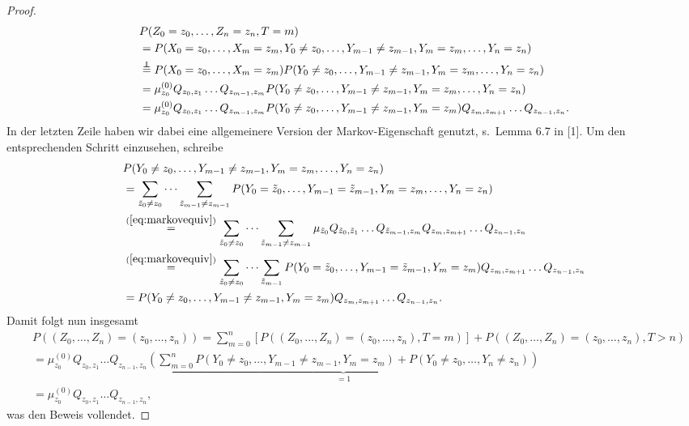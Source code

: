 \documentclass[twoside]{article}
\newcommand\independent{\protect\mathpalette{\protect\independenT}{\perp}}
\def\independenT#1#2{\mathrel{\rlap{$#1#2$}\mkern2mu{#1#2}}}
\theoremstyle{definition}
\begin{document}
\begin{proof}
\begin{align}
&P(Z_0= z_0,\dots,Z_n=z_n, T = m)\\
&=P(X_0 = z_0, \dots , X_m = z_m , Y_0 \neq z_0 , \dots , Y_{m-1} \neq z_{m-1} , Y_m = z_m , \dots , Y_n = z_n)\\
&\overset{\independent}{=}P(X_0 = z_0, \dots , X_m = z_m) P(Y_0 \neq z_0 , \dots , Y_{m-1} \neq z_{m-1} , Y_m = z_m , \dots , Y_n = z_n)\\
&= \mu_{z_0}^{(0)} Q_{z_0,z_1} \dots Q_{z_{m-1},z_m} P(Y_0 \neq z_0 , \dots , Y_{m-1} \neq z_{m-1} , Y_m = z_m , \dots , Y_n = z_n)\\
&=\mu_{z_0}^{(0)} Q_{z_0,z_1} \dots Q_{z_{m-1},z_m} P(Y_0 \neq z_0 , \dots , Y_{m-1} \neq z_{m-1} , Y_m = z_m) Q_{z_m,z_{m+1}} \dots Q_{z_{n-1},z_n}.
\end{align}
In der letzten Zeile haben wir dabei eine allgemeinere Version der Markov-Eigenschaft genutzt, s.\ Lemma 6.7 in [1]. Um den entsprechenden Schritt einzusehen, schreibe
\begin{align}
&P(Y_0 \neq z_0 , \dots , Y_{m-1} \neq z_{m-1} , Y_m = z_m , \dots , Y_n = z_n) \\
&=\sum_{\tilde{z}_0 \neq z_0} \dots \sum_{\tilde{z}_{m-1} \neq z_{m-1}} P(Y_0 = \tilde{z}_0 , \dots , Y_{m-1} = \tilde{z}_{m-1} , Y_m = z_m , \dots , Y_n = z_n)\\
&\overset{(\ref{eq:markovequiv})}{=}\sum_{\tilde{z}_0 \neq z_0} \dots \sum_{\tilde{z}_{m-1} \neq z_{m-1}} \mu_{\tilde{z}_0} Q_{\tilde{z}_0,\tilde{z}_1} \dots Q_{\tilde{z}_{m-1},z_m} Q_{z_m, z_{m+1}} \dots Q_{z_{n-1}, z_n}\\
&\overset{(\ref{eq:markovequiv})}{=}\sum_{\tilde{z}_0 \neq z_0} \dots \sum_{\tilde{z}_{m-1}} P(Y_0 = \tilde{z}_0 , \dots , Y_{m-1} = \tilde{z}_{m-1} , Y_m = z_m) Q_{z_m, z_{m+1}} \dots Q_{z_{n-1}, z_n}\\
&= P(Y_0 \neq z_0 , \dots , Y_{m-1} \neq z_{m-1} , Y_m = z_m) Q_{z_m, z_{m+1}} \dots Q_{z_{n-1}, z_n}.
\end{align}
Damit folgt nun insgesamt
\begin{align}
&P((Z_0,\dots,Z_n)=(z_0,\dots,z_n))= \sum_{m=0}^n \left[ P((Z_0,\dots,Z_n)=(z_0,\dots,z_n), T = m) \right] + P((Z_0,\dots,Z_n)=(z_0,\dots,z_n), T > n)\\
&= \mu_{z_0}^{(0)} Q_{z_0,z_1} \dots Q_{z_{n-1},z_n} \underbrace{\left(\sum_{m=0}^n P(Y_0 \neq z_0,  \dots , Y_{m-1} \neq z_{m-1} , Y_m = z_m) + P(Y_0 \neq z_0 , \dots , Y_n \neq z_n)\right)}_{=1}\\
&= \mu_{z_0}^{(0)} Q_{z_0,z_1} \dots Q_{z_{n-1},z_n},
\end{align}
was den Beweis vollendet.
\end{proof}
\end{document}

